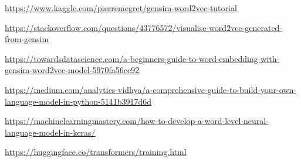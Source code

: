 \documentclass[a4paper]{article}
\begin{document}
\begin{thebibliography}{9}
\begin{LTRbibitems}

\resetlatinfont
{}
\url{https://www.kaggle.com/pierremegret/gensim-word2vec-tutorial}


\url{https://stackoverflow.com/questions/43776572/visualise-word2vec-generated-from-gensim}

\url{https://towardsdatascience.com/a-beginners-guide-to-word-embedding-with-gensim-word2vec-model-5970fa56cc92}

\url{https://medium.com/analytics-vidhya/a-comprehensive-guide-to-build-your-own-language-model-in-python-5141b3917d6d}


\url{https://machinelearningmastery.com/how-to-develop-a-word-level-neural-language-model-in-keras/}

\url{https://huggingface.co/transformers/training.html}
\end{LTRbibitems}
\end{thebibliography}
\end{document}
